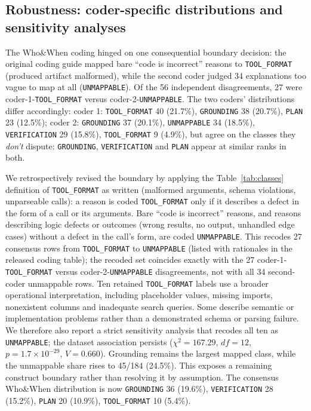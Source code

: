 \documentclass[12pt,letterpaper]{article}
\begin{document}
\subsection{Robustness: coder-specific distributions and sensitivity analyses}
\label{sec:robustness}
The Who\&When coding hinged on one consequential boundary decision: the
original coding guide mapped bare ``code is incorrect'' reasons to \texttt{TOOL\_FORMAT}
(produced artifact malformed), while the second coder judged 34 explanations
too vague to map at all (\texttt{UNMAPPABLE}). Of the 56 independent
disagreements, 27 were coder-1-\texttt{TOOL\_FORMAT} versus
coder-2-\texttt{UNMAPPABLE}. The two coders' distributions differ
accordingly: coder 1: \texttt{TOOL\_FORMAT} 40 (21.7\%), \texttt{GROUNDING}
38 (20.7\%), \texttt{PLAN} 23 (12.5\%); coder 2: \texttt{GROUNDING} 37
(20.1\%), \texttt{UNMAPPABLE} 34 (18.5\%), \texttt{VERIFICATION} 29 (15.8\%),
\texttt{TOOL\_FORMAT} 9 (4.9\%), but agree on the classes they
\emph{don't} dispute: \texttt{GROUNDING}, \texttt{VERIFICATION} and
\texttt{PLAN} appear at similar ranks in both.

We retrospectively revised the boundary by applying the Table~\ref{tab:classes} definition of
\texttt{TOOL\_FORMAT} as written (malformed arguments, schema violations,
unparseable calls): a reason is coded \texttt{TOOL\_FORMAT} only if it
describes a defect in the form of a call or its arguments. Bare ``code is
incorrect'' reasons, and reasons describing logic defects or outcomes (wrong
results, no output, unhandled edge cases) without a defect in the call's
form, are coded \texttt{UNMAPPABLE}. This recodes 27 consensus rows from
\texttt{TOOL\_FORMAT} to \texttt{UNMAPPABLE} (listed with rationales in the
released coding table); the recoded set coincides exactly with the 27 coder-1-\texttt{TOOL\_FORMAT}
versus coder-2-\texttt{UNMAPPABLE} disagreements, not with all 34
second-coder unmappable rows. Ten retained \texttt{TOOL\_FORMAT} labels use a broader operational
interpretation, including placeholder values, missing imports, nonexistent
columns and inadequate search queries. Some describe semantic or
implementation problems rather than a demonstrated schema or parsing
failure. We therefore also report a strict sensitivity analysis that recodes
all ten as \texttt{UNMAPPABLE}; the dataset association persists
($\chi^2{=}167.29$, $df{=}12$, $p{=}1.7\times10^{-29}$,
$V{=}0.660$). Grounding remains the largest mapped class, while the
unmappable share rises to 45/184 (24.5\%). This exposes a remaining
construct boundary rather than resolving it by assumption.
The consensus Who\&When distribution is now
\texttt{GROUNDING} 36 (19.6\%), \texttt{VERIFICATION} 28 (15.2\%),
\texttt{PLAN} 20 (10.9\%), \texttt{TOOL\_FORMAT} 10 (5.4\%).
\end{document}
